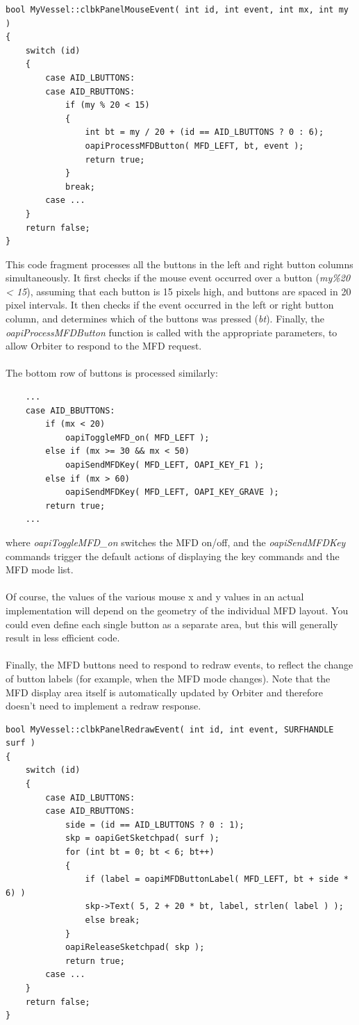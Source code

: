 \documentclass[Orbiter Developer Manual.tex]{subfiles}
\begin{document}
\begin{lstlisting}
bool MyVessel::clbkPanelMouseEvent( int id, int event, int mx, int my )
{
	switch (id)
	{
		case AID_LBUTTONS:
		case AID_RBUTTONS:
			if (my % 20 < 15)
			{
				int bt = my / 20 + (id == AID_LBUTTONS ? 0 : 6);
				oapiProcessMFDButton( MFD_LEFT, bt, event );
				return true;
			}
			break;
		case ...
	}
	return false;
}
\end{lstlisting}

\noindent
This code fragment processes all the buttons in the left and right button columns simultaneously. It first checks if the mouse event occurred over a button (\textit{my\%20 < 15}), assuming that each button is 15 pixels high, and buttons are spaced in 20 pixel intervals. It then checks if the event occurred in the left or right button column, and determines which of the buttons was pressed (\textit{bt}). Finally, the \textit{oapiProcessMFDButton} function is called with the appropriate parameters, to allow Orbiter to respond to the MFD request.\\
\\
The bottom row of buttons is processed similarly:

\begin{lstlisting}
	...
	case AID_BBUTTONS:
		if (mx < 20)
			oapiToggleMFD_on( MFD_LEFT );
		else if (mx >= 30 && mx < 50)
			oapiSendMFDKey( MFD_LEFT, OAPI_KEY_F1 );
		else if (mx > 60)
			oapiSendMFDKey( MFD_LEFT, OAPI_KEY_GRAVE );
		return true;
	...
\end{lstlisting}

\noindent
where \textit{oapiToggleMFD\_on} switches the MFD on/off, and the \textit{oapiSendMFDKey} commands trigger the default actions of displaying the key commands and the MFD mode list.\\
\\
Of course, the values of the various mouse x and y values in an actual implementation will depend on the geometry of the individual MFD layout. You could even define each single button as a separate area, but this will generally result in less efficient code.\\
\\
Finally, the MFD buttons need to respond to redraw events, to reflect the change of button labels (for example, when the MFD mode changes). Note that the MFD display area itself is automatically updated by Orbiter and therefore doesn't need to implement a redraw response.

\begin{lstlisting}
bool MyVessel::clbkPanelRedrawEvent( int id, int event, SURFHANDLE surf )
{
	switch (id)
	{
		case AID_LBUTTONS:
		case AID_RBUTTONS:
			side = (id == AID_LBUTTONS ? 0 : 1);
			skp = oapiGetSketchpad( surf );
			for (int bt = 0; bt < 6; bt++)
			{
				if (label = oapiMFDButtonLabel( MFD_LEFT, bt + side * 6) )
				skp->Text( 5, 2 + 20 * bt, label, strlen( label ) );
				else break;
			}
			oapiReleaseSketchpad( skp );
			return true;
		case ...
	}
	return false;
}
\end{lstlisting}
\end{document}
